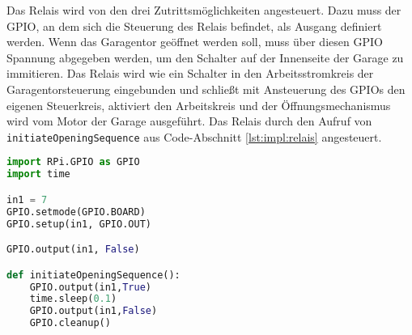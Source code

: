 Das Relais wird von den drei Zutrittsmöglichkeiten angesteuert. Dazu muss der GPIO, an dem sich die Steuerung des Relais befindet, als Ausgang definiert werden. Wenn das Garagentor geöffnet werden soll, muss über diesen GPIO Spannung abgegeben werden, um den Schalter auf der Innenseite der Garage zu immitieren. Das Relais wird wie ein Schalter in den Arbeitsstromkreis der Garagentorsteuerung eingebunden und schließt mit Ansteuerung des GPIOs den eigenen Steuerkreis, aktiviert den Arbeitskreis und der Öffnungsmechanismus wird vom Motor der Garage ausgeführt. Das Relais durch den Aufruf von \verb|initiateOpeningSequence| aus Code-Abschnitt \ref{lst:impl:relais} angesteuert. 

\begin{lstlisting}[language=Python, caption=Ansteuerung des Relais, label=lst:impl:relais]
import RPi.GPIO as GPIO
import time

in1 = 7
GPIO.setmode(GPIO.BOARD)
GPIO.setup(in1, GPIO.OUT)

GPIO.output(in1, False)

def initiateOpeningSequence():
    GPIO.output(in1,True)
    time.sleep(0.1)
    GPIO.output(in1,False)
    GPIO.cleanup()
\end{lstlisting}
